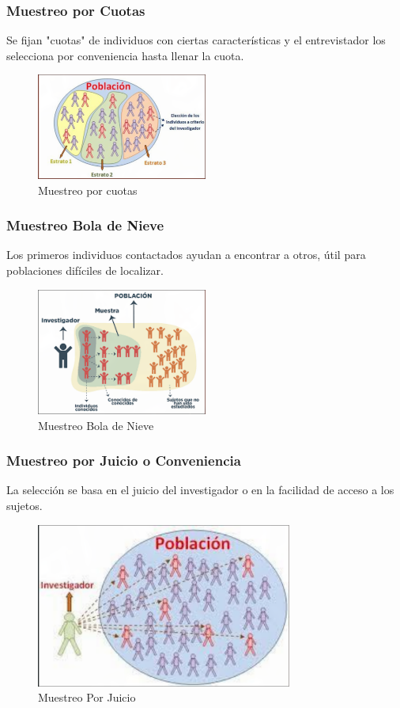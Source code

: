 \documentclass[12pt, letterpaper]{article}
\begin{document}
\subsubsection{Muestreo por Cuotas}
Se fijan "cuotas" de individuos con ciertas características y el entrevistador los selecciona por conveniencia hasta llenar la cuota.
\begin{figure}[htbp]
	\centering
	\includegraphics[width=0.5\textwidth]{MPCU}
	\caption{Muestreo por cuotas}
	\label{fig:MPCU}
\end{figure}

\subsubsection{Muestreo Bola de Nieve}
Los primeros individuos contactados ayudan a encontrar a otros, útil para poblaciones difíciles de localizar.
\begin{figure}[htbp]
	\centering
	\includegraphics[width=0.5\textwidth]{MBN}
	\caption{Muestreo Bola de Nieve}
	\label{fig:MBC}
\end{figure}

\subsubsection{Muestreo por Juicio o Conveniencia}
La selección se basa en el juicio del investigador o en la facilidad de acceso a los sujetos.
\begin{figure}[htbp]
	\centering
	\includegraphics[width=0.75\textwidth]{MPJ}
	\caption{Muestreo Por Juicio}
	\label{fig:MPJ}
\end{figure}
\end{document}
